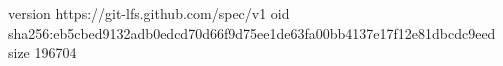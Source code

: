 version https://git-lfs.github.com/spec/v1
oid sha256:eb5cbed9132adb0edcd70d66f9d75ee1de63fa00bb4137e17f12e81dbcdc9eed
size 196704
